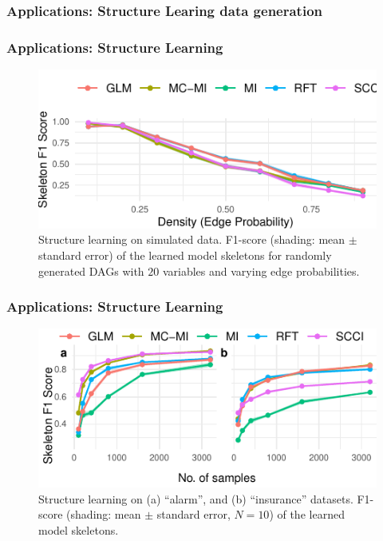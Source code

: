 \documentclass{beamer}
\begin{document}
\begin{frame}
	\frametitle{Applications: Structure Learing data generation}
\end{frame}

\begin{frame}
	\frametitle{Applications: Structure Learning}
	\begin{figure}
		\centering
		\includegraphics{imgs/sl_density.pdf}
		\caption*{Structure learning on simulated data. F1-score
		(shading: mean $\pm$ standard error) of the learned model
		skeletons for randomly generated DAGs with $20$ variables and
		varying edge probabilities.}
	\end{figure}
\end{frame}

\begin{frame}
	\frametitle{Applications: Structure Learning}
	\begin{figure}
		\centering
		\includegraphics{imgs/sl.pdf}
		\caption*{Structure learning on (a) ``alarm'', and (b)
		``insurance'' datasets.  F1-score (shading: mean $\pm$ standard
		error, $N=10$) of the learned model skeletons.}
	\end{figure}
\end{frame}
\end{document}
